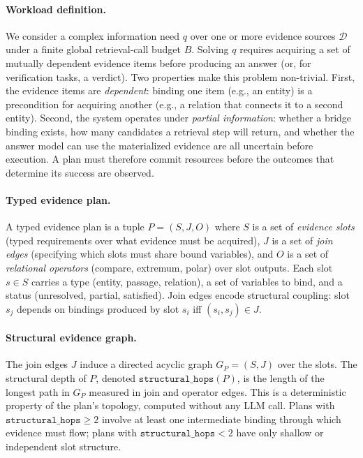 \paragraph{Workload definition.}
We consider a complex information need $q$ over one or more evidence sources $\mathcal{D}$ under a finite global retrieval-call budget $B$. Solving $q$ requires acquiring a set of mutually dependent evidence items before producing an answer (or, for verification tasks, a verdict). Two properties make this problem non-trivial. First, the evidence items are \emph{dependent}: binding one item (e.g., an entity) is a precondition for acquiring another (e.g., a relation that connects it to a second entity). Second, the system operates under \emph{partial information}: whether a bridge binding exists, how many candidates a retrieval step will return, and whether the answer model can use the materialized evidence are all uncertain before execution. A plan must therefore commit resources before the outcomes that determine its success are observed.

\paragraph{Typed evidence plan.}
A typed evidence plan is a tuple $P = (S, J, O)$ where $S$ is a set of \emph{evidence slots} (typed requirements over what evidence must be acquired), $J$ is a set of \emph{join edges} (specifying which slots must share bound variables), and $O$ is a set of \emph{relational operators} (compare, extremum, polar) over slot outputs. Each slot $s \in S$ carries a type (entity, passage, relation), a set of variables to bind, and a status (unresolved, partial, satisfied). Join edges encode structural coupling: slot $s_j$ depends on bindings produced by slot $s_i$ iff $(s_i, s_j) \in J$.

\paragraph{Structural evidence graph.}
The join edges $J$ induce a directed acyclic graph $G_P = (S, J)$ over the slots. The structural depth of $P$, denoted $\texttt{structural\_hops}(P)$, is the length of the longest path in $G_P$ measured in join and operator edges. This is a deterministic property of the plan's topology, computed without any LLM call. Plans with $\texttt{structural\_hops} \geq 2$ involve at least one intermediate binding through which evidence must flow; plans with $\texttt{structural\_hops} < 2$ have only shallow or independent slot structure.

